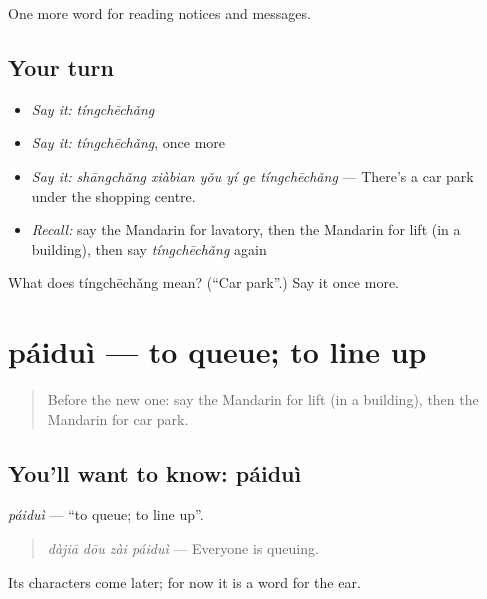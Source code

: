 \begin{grammarlens}[title={What you've built}]
One more word for reading notices and messages.
\end{grammarlens}

\subsection*{Your turn}
\begin{itemize}
\raggedright
  \item \emph{Say it:} \emph{tíngchēchǎng}
  \item \emph{Say it:} \emph{tíngchēchǎng}, once more
  \item \emph{Say it:} \emph{shāngchǎng xiàbian yǒu yí ge tíngchēchǎng} — There's a car park under the shopping centre.
  \item \emph{Recall:} say the Mandarin for lavatory, then the Mandarin for lift (in a building), then say \emph{tíngchēchǎng} again
\end{itemize}

\begin{tcolorbox}[breakable,colback=teal!4,colframe=teal!35!black,title={Before you move on}]
What does tíngchēchǎng mean? (\textquotedblleft{}Car park\textquotedblright{}.) Say it once more.
\end{tcolorbox}
\section[páiduì]{páiduì — to queue; to line up}

\label{lesson:ZH-C192-paidui}



\begin{quote}
Before the new one: say the Mandarin for lift (in a building), then the Mandarin for car park.
\end{quote}

\subsection*{You'll want to know: páiduì}
\emph{páiduì} — \textquotedblleft{}to queue; to line up\textquotedblright{}.

\begin{quote}
\emph{dàjiā dōu zài páiduì} — Everyone is queuing.
\end{quote}

Its characters come later; for now it is a word for the ear.

